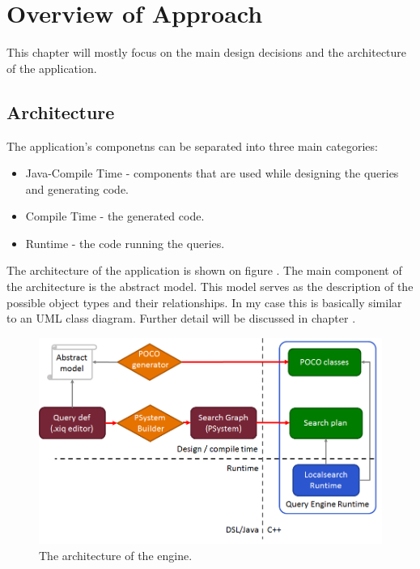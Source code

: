 \chapter{Overview of Approach}

This chapter will mostly focus on the main design decisions and the architecture
of the application.

\section{Architecture}\label{sec:Architecture}

The application's componetns can be separated into three main categories:

\begin{itemize}
  \item Java-Compile Time - components that are used while designing the
  queries and generating code.
  \item \CPP{} Compile Time - the generated code.
  \item \CPP{} Runtime - the code running the queries.
\end{itemize}

The architecture of the application is shown on figure .
The main component of the architecture is the abstract model. This model
serves as the description of the possible object types and their relationships.
In my case this is basically similar to an UML class diagram. Further
detail will be discussed in chapter .

\begin{figure}[!ht]
\centering
\includegraphics[width=150mm, keepaspectratio]{figures/architecture.png}
\caption{The architecture of the engine.}
\label{fig:architecture}
\end{figure}

